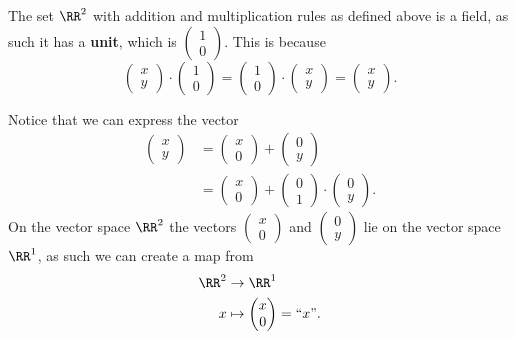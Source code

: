 \documentclass[12pt, a4paper]{article}
\begin{document}
The set \(\RR^2\) with addition and multiplication rules as defined above is a field, as such it has a \textbf{unit}, which is \(\begin{pmatrix}
    1 \\0
\end{pmatrix}\). This is because
\[
    \begin{pmatrix}
    x \\ y 
    \end{pmatrix} \cdot 
    \begin{pmatrix}
        1 \\0 
    \end{pmatrix} =
    \begin{pmatrix}
        1 \\0 
    \end{pmatrix} \cdot
    \begin{pmatrix}
        x \\ y 
    \end{pmatrix}
    =
    \begin{pmatrix}
        x \\ y 
    \end{pmatrix}.
\]

Notice that we can express the vector 
\[\begin{aligned}
    \begin{pmatrix}
        x \\ y 
    \end{pmatrix} &= 
    \begin{pmatrix}
        x \\ 0
    \end{pmatrix}
    +
    \begin{pmatrix}
        0 \\ y
    \end{pmatrix} \\
    &= 
    \begin{pmatrix}
        x \\ 0 
    \end{pmatrix} +
    \begin{pmatrix}
        0 \\ 1 
    \end{pmatrix}
    \cdot
    \begin{pmatrix}
        0 \\ y 
    \end{pmatrix}.
\end{aligned}\]
On the vector space \(\RR^2\) the vectors \(\begin{pmatrix} x \\ 0 \end{pmatrix}\) and \(\begin{pmatrix} 0 \\ y \end{pmatrix}\) lie on the vector space \(\RR^1\), as such we can create a map from 
\[\begin{aligned}
    \RR^2 &\to \RR^1 \\
    x &\mapsto \begin{pmatrix} x \\ 0 \end{pmatrix} = ``x".
\end{aligned}\]
\end{document}
